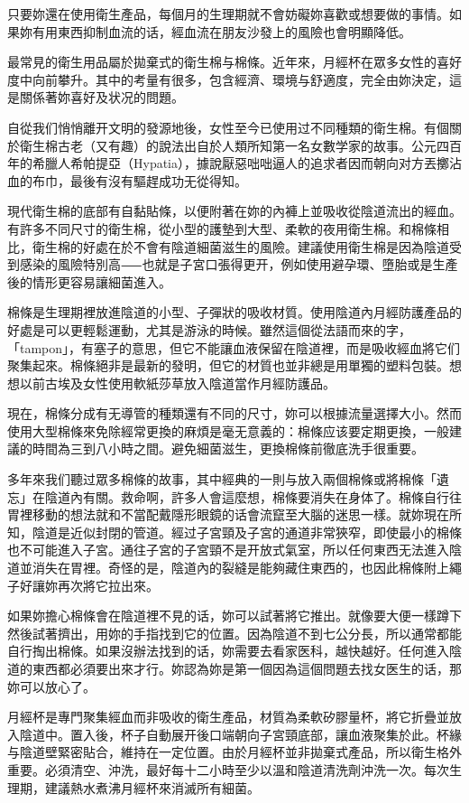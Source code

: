\documentclass[12pt,UTF8]{ctexbook}
\begin{document}
只要妳還在使用衛生產品，每個月的生理期就不會妨礙妳喜歡或想要做的事情。如果妳有用東西抑制血流的话，經血流在朋友沙發上的風險也會明顯降低。

最常見的衛生用品屬於拋棄式的衛生棉与棉條。近年來，月經杯在眾多女性的喜好度中向前攀升。其中的考量有很多，包含經濟、環境与舒適度，完全由妳決定，這是關係著妳喜好及状况的問題。

自從我们悄悄離开文明的發源地後，女性至今已使用过不同種類的衛生棉。有個關於衛生棉古老（又有趣）的說法出自於人類所知第一名女數学家的故事。公元四百年的希臘人希帕提亞（Hypatia），據說厭惡咄咄逼人的追求者因而朝向对方丟擲沾血的布巾，最後有沒有驅趕成功无從得知。

現代衛生棉的底部有自黏貼條，以便附著在妳的內褲上並吸收從陰道流出的經血。有許多不同尺寸的衛生棉，從小型的護墊到大型、柔軟的夜用衛生棉。和棉條相比，衛生棉的好處在於不會有陰道細菌滋生的風險。建議使用衛生棉是因為陰道受到感染的風險特別高⸺也就是子宮口張得更开，例如使用避孕環、墮胎或是生產後的情形更容易讓細菌進入。

棉條是生理期裡放進陰道的小型、子彈狀的吸收材質。使用陰道內月經防護產品的好處是可以更輕鬆運動，尤其是游泳的時候。雖然這個從法語而來的字，「tampon」，有塞子的意思，但它不能讓血液保留在陰道裡，而是吸收經血將它们聚集起來。棉條絕非是最新的發明，但它的材質也並非總是用單獨的塑料包裝。想想以前古埃及女性使用軟紙莎草放入陰道當作月經防護品。

現在，棉條分成有无導管的種類還有不同的尺寸，妳可以根據流量選擇大小。然而使用大型棉條來免除經常更換的麻煩是毫无意義的：棉條应该要定期更換，一般建議的時間為三到八小時之間。避免細菌滋生，更換棉條前徹底洗手很重要。

多年來我们聽过眾多棉條的故事，其中經典的一則与放入兩個棉條或將棉條「遺忘」在陰道內有關。救命啊，許多人會這麼想，棉條要消失在身体了。棉條自行往胃裡移動的想法就和不當配戴隱形眼鏡的话會流竄至大腦的迷思一樣。就妳現在所知，陰道是近似封閉的管道。經过子宮頸及子宮的通道非常狹窄，即使最小的棉條也不可能進入子宮。通往子宮的子宮頸不是开放式氣室，所以任何東西无法進入陰道並消失在胃裡。奇怪的是，陰道內的裂縫是能夠藏住東西的，也因此棉條附上繩子好讓妳再次將它拉出來。

如果妳擔心棉條會在陰道裡不見的话，妳可以試著將它推出。就像要大便一樣蹲下然後試著擠出，用妳的手指找到它的位置。因為陰道不到七公分長，所以通常都能自行掏出棉條。如果沒辦法找到的话，妳需要去看家医科，越快越好。任何進入陰道的東西都必須要出來才行。妳認為妳是第一個因為這個問題去找女医生的话，那妳可以放心了。

月經杯是專門聚集經血而非吸收的衛生產品，材質為柔軟矽膠量杯，將它折疊並放入陰道中。置入後，杯子自動展开後口端朝向子宮頸底部，讓血液聚集於此。杯緣与陰道壁緊密貼合，維持在一定位置。由於月經杯並非拋棄式產品，所以衛生格外重要。必須清空、沖洗，最好每十二小時至少以溫和陰道清洗劑沖洗一次。每次生理期，建議熱水煮沸月經杯來消滅所有細菌。
\end{document}
